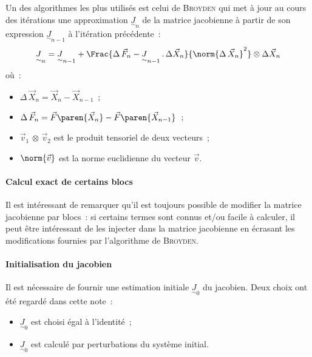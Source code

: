 \documentclass[12pt]{article}
\begin{document}
Un des algorithmes les plus utilisés est celui de \textsc{Broyden} qui
met à jour au cours des itérations une approximation
\(\underset{\sim}{J}_{n}\) de la matrice jacobienne à partir de son
expression \(\underset{\sim}{J}_{n-1}\) à l'itération
précédente~:
\begin{equation}
  \label{eq:Broyden}
  \underset{\sim}{J}_{n} = \underset{\sim}{J}_{n-1}+\Frac{\Delta\,\vec{F}_{n}-\underset{\sim}{J}_{n-1}\,.\,\Delta\vec{X}_{n}}{\norm{\Delta\,\vec{X}_{n}}^{2}}\otimes\Delta\vec{X}_{n}
\end{equation}
où~:
\begin{minipage}[t]{0.8\linewidth}
  \begin{itemize}
    \item \(\Delta\,\vec{X}_{n}=\vec{X}_{n}-\vec{X}_{n-1}\)~;
    \item \(\Delta\,\vec{F}_{n}=\vec{F}\paren{\vec{X}_{n}}-\vec{F}\paren{\vec{X}_{n-1}}\)~;
    \item \(\vec{v}_{1}\,\otimes\,\vec{v}_{2}\) est le produit tensoriel
    de deux vecteurs~;
    \item \(\norm{\vec{v}}\) est la norme euclidienne du vecteur
    \(\vec{v}\).
  \end{itemize}
\end{minipage}

\paragraph{Calcul exact de certains blocs}
Il est intéressant de remarquer qu'il est toujours possible de modifier
la matrice jacobienne par blocs~: si certains termes sont connus et/ou
facile à calculer, il peut être intéressant de les injecter dans la
matrice jacobienne en écrasant les modifications fournies par
l'algorithme de \textsc{Broyden}.

\paragraph{Initialisation du jacobien} Il est nécessaire de fournir une
estimation initiale \(\underset{\sim}{J}_{0}\) du jacobien. Deux
choix ont été regardé dans cette note~:
\begin{itemize}
  \item \(\underset{\sim}{J}_{0}\) est choisi égal à l'identité~;
  \item \(\underset{\sim}{J}_{0}\) est calculé par perturbations du
  système initial.
\end{itemize}
\end{document}

